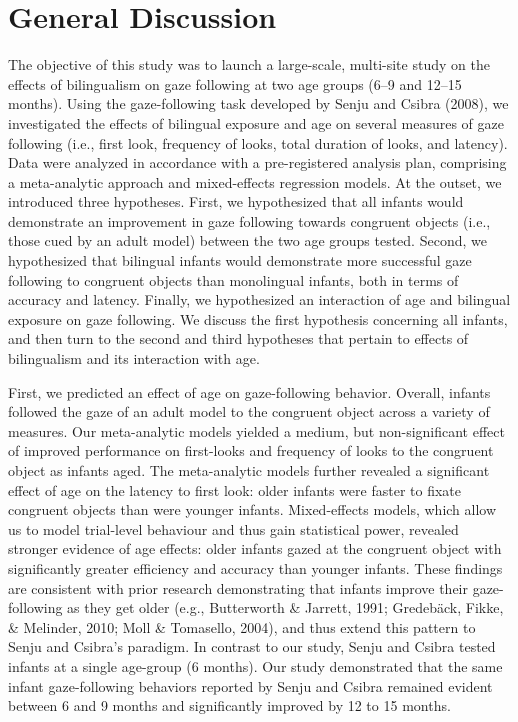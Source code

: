 \documentclass[,man,floatsintext]{apa6}
\begin{document}
\hypertarget{general-discussion}{%
\section{General Discussion}\label{general-discussion}}

The objective of this study was to launch a large-scale, multi-site study on the effects of bilingualism on gaze following at two age groups (6--9 and 12--15 months). Using the gaze-following task developed by Senju and Csibra (2008), we investigated the effects of bilingual exposure and age on several measures of gaze following (i.e., first look, frequency of looks, total duration of looks, and latency). Data were analyzed in accordance with a pre-registered analysis plan, comprising a meta-analytic approach and mixed-effects regression models. At the outset, we introduced three hypotheses. First, we hypothesized that all infants would demonstrate an improvement in gaze following towards congruent objects (i.e., those cued by an adult model) between the two age groups tested. Second, we hypothesized that bilingual infants would demonstrate more successful gaze following to congruent objects than monolingual infants, both in terms of accuracy and latency. Finally, we hypothesized an interaction of age and bilingual exposure on gaze following. We discuss the first hypothesis concerning all infants, and then turn to the second and third hypotheses that pertain to effects of bilingualism and its interaction with age.

First, we predicted an effect of age on gaze-following behavior. Overall, infants followed the gaze of an adult model to the congruent object across a variety of measures. Our meta-analytic models yielded a medium, but non-significant effect of improved performance on first-looks and frequency of looks to the congruent object as infants aged. The meta-analytic models further revealed a significant effect of age on the latency to first look: older infants were faster to fixate congruent objects than were younger infants. Mixed-effects models, which allow us to model trial-level behaviour and thus gain statistical power, revealed stronger evidence of age effects: older infants gazed at the congruent object with significantly greater efficiency and accuracy than younger infants. These findings are consistent with prior research demonstrating that infants improve their gaze-following as they get older (e.g., Butterworth \& Jarrett, 1991; Gredebäck, Fikke, \& Melinder, 2010; Moll \& Tomasello, 2004), and thus extend this pattern to Senju and Csibra's paradigm. In contrast to our study, Senju and Csibra tested infants at a single age-group (6 months). Our study demonstrated that the same infant gaze-following behaviors reported by Senju and Csibra remained evident between 6 and 9 months and significantly improved by 12 to 15 months.
\end{document}
